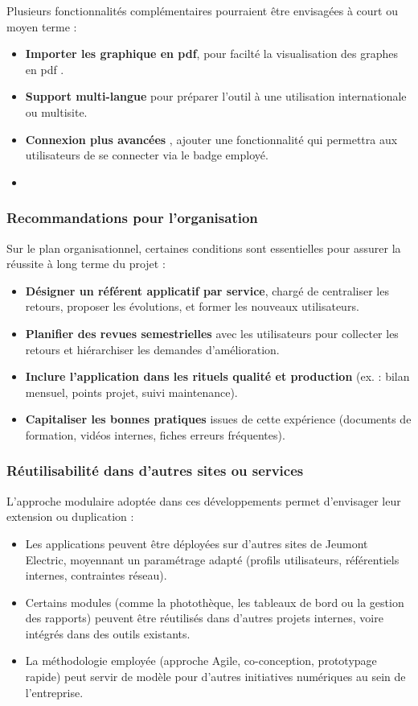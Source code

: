 \documentclass[11pt,a4paper]{article}
\begin{document}
Plusieurs fonctionnalités complémentaires pourraient être envisagées à court ou moyen terme :

\begin{itemize}
    \item \textbf{Importer les graphique en pdf}, pour facilté la visualisation des graphes en pdf .
    \item \textbf{Support multi-langue} pour préparer l’outil à une utilisation internationale ou multisite.
    \item \textbf{Connexion plus avancées} , ajouter une fonctionnalité qui permettra aux utilisateurs de se connecter via le badge employé.
\item 
\end{itemize}

\subsubsection{Recommandations pour l’organisation}

Sur le plan organisationnel, certaines conditions sont essentielles pour assurer la réussite à long terme du projet :

\begin{itemize}
    \item \textbf{Désigner un référent applicatif par service}, chargé de centraliser les retours, proposer les évolutions, et former les nouveaux utilisateurs.
    \item \textbf{Planifier des revues semestrielles} avec les utilisateurs pour collecter les retours et hiérarchiser les demandes d’amélioration.
    \item \textbf{Inclure l’application dans les rituels qualité et production} (ex. : bilan mensuel, points projet, suivi maintenance).
    \item \textbf{Capitaliser les bonnes pratiques} issues de cette expérience (documents de formation, vidéos internes, fiches erreurs fréquentes).
\end{itemize}

\subsubsection{Réutilisabilité dans d’autres sites ou services}

L’approche modulaire adoptée dans ces développements permet d’envisager leur extension ou duplication :

\begin{itemize}
    \item Les applications peuvent être déployées sur d’autres sites de Jeumont Electric, moyennant un paramétrage adapté (profils utilisateurs, référentiels internes, contraintes réseau).
    \item Certains modules (comme la photothèque, les tableaux de bord ou la gestion des rapports) peuvent être réutilisés dans d’autres projets internes, voire intégrés dans des outils existants.
    \item La méthodologie employée (approche Agile, co-conception, prototypage rapide) peut servir de modèle pour d’autres initiatives numériques au sein de l’entreprise.
\end{itemize}
\end{document}
